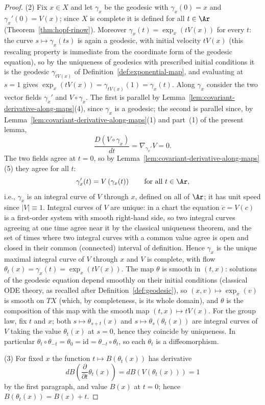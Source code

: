 \begin{proof}
(2) Fix $x\in X$ and let $\gamma_x$ be the geodesic with
$\gamma_x(0)=x$ and $\gamma_x'(0)=V(x)$; since $X$ is complete it is
defined for all $t\in\Ar$ (Theorem~\ref{thm:hopf-rinow}). Moreover
$\gamma_x(t)=\exp_x(tV(x))$ for every $t$: the curve
$s\mapsto\gamma_x(ts)$ is again a geodesic, with initial velocity
$tV(x)$ (this rescaling property is immediate from the coordinate form
of the geodesic equation), so by the uniqueness of geodesics with
prescribed initial conditions it is the geodesic $\gamma_{tV(x)}$ of
Definition~\ref{def:exponential-map}, and evaluating at $s=1$ gives
$\exp_x(tV(x))=\gamma_{tV(x)}(1)=\gamma_x(t)$. Along $\gamma_x$ consider the
two vector fields $\gamma_x'$ and $V\circ\gamma_x$. The first is
parallel by Lemma~\ref{lem:covariant-derivative-along-maps}(4), since
$\gamma_x$ is a geodesic; the second is parallel since, by
Lemma~\ref{lem:covariant-derivative-along-maps}(1) and part~(1) of the
present lemma,
$$\frac{D(V\circ\gamma_x)}{dt}=\nabla_{\gamma_x'}V=0 .$$
The two fields agree at $t=0$, so by
Lemma~\ref{lem:covariant-derivative-along-maps}(5) they agree for all
$t$:
$$\gamma_x'(t)=V\left(\gamma_x(t)\right)\qquad\text{for all }t\in\Ar,$$
i.e., $\gamma_x$ is an integral curve of $V$ through $x$, defined on all
of $\Ar$; it has unit speed since $|V|\equiv1$. Integral curves of $V$
are unique: in a chart the equation $\dot c=V(c)$ is a first-order
system with smooth right-hand side, so two integral curves agreeing at
one time agree near it by the classical uniqueness theorem, and the set
of times where two integral curves with a common value agree is open
and closed in their common (connected) interval of definition. Hence
$\gamma_x$ is the unique maximal integral curve of $V$ through $x$ and
$V$ is complete, with flow $\theta_t(x)=\gamma_x(t)=\exp_x(tV(x))$. The
map $\theta$ is smooth in $(t,x)$: solutions of the geodesic equation
depend smoothly on their initial conditions (classical ODE theory, as
recalled after Definition~\ref{def:geodesic}), so
$(x,v)\mapsto\exp_x(v)$ is smooth on $TX$ (which, by completeness, is
its whole domain), and $\theta$ is the composition of this map with the
smooth map $(t,x)\mapsto tV(x)$. For the group law, fix $t$ and $x$;
both $s\mapsto\theta_{s+t}(x)$ and $s\mapsto\theta_s(\theta_t(x))$ are
integral curves of $V$ taking the value $\theta_t(x)$ at $s=0$, hence
they coincide by uniqueness. In particular
$\theta_t\circ\theta_{-t}=\theta_0=\mathrm{id}=\theta_{-t}\circ\theta_t$,
so each $\theta_t$ is a diffeomorphism.

(3) For fixed $x$ the function $t\mapsto B(\theta_t(x))$ has derivative
$$dB\left(\frac{\partial}{\partial t}\theta_t(x)\right)
=dB\left(V(\theta_t(x))\right)=1$$
by the first paragraph, and value $B(x)$ at $t=0$; hence
$B(\theta_t(x))=B(x)+t$.


\end{proof}

